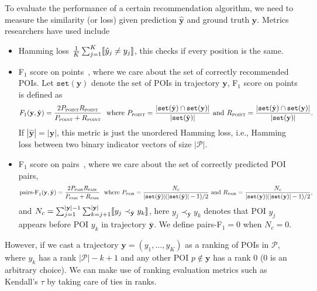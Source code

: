 To evaluate the performance of a certain recommendation algorithm,
we need to measure the similarity (or loss) given prediction $\hat{\mathbf{y}}$ and ground truth $\mathbf{y}$.
Metrics researchers have used include
\begin{itemize}
\item Hamming loss $\frac{1}{K} \sum_{j=1}^K \llbracket \hat{y}_j \neq y_j \rrbracket$, this checks if every position is the same.

\item F$_1$ score on points~\cite{ijcai15}, where we care about the set of correctly recommended POIs. 
      Let $\texttt{set}(\mathbf{y})$ denote the set of POIs in trajectory $\mathbf{y}$, F$_1$ score on points is defined as
\begin{equation*}
F_1(\mathbf{y}, \hat{\mathbf{y}}) = \frac{2  P_{\textsc{point}}  R_{\textsc{point}}}{P_{\textsc{point}} + R_{\textsc{point}}} ~~\text{where}~
P_{\textsc{point}} = \frac{| \texttt{set}(\hat{\mathbf{y}}) \cap \texttt{set}(\mathbf{y}) |}{| \texttt{set}(\hat{\mathbf{y}}) |}~\text{and}~
R_{\textsc{point}} = \frac{| \texttt{set}(\hat{\mathbf{y}}) \cap \texttt{set}(\mathbf{y}) |}{| \texttt{set}(\mathbf{y}) |}.
\end{equation*}
If $| \hat{\mathbf{y}} | = | \mathbf{y} |$, this metric is just the unordered Hamming loss, 
i.e., Hamming loss between two binary indicator vectors of size $| \mathcal{P} |$.

\item F$_1$ score on pairs~\cite{cikm16paper}, where we care about the set of correctly predicted POI pairs,
\begin{equation*}
\text{pairs-F}_1(\mathbf{y}, \hat{\mathbf{y}}) = \frac{2 P_{\textsc{pair}} R_{\textsc{pair}}}{P_{\textsc{pair}} + R_{\textsc{pair}}}~~\text{where}~
P_{\textsc{pair}} = \frac{N_c} {| \texttt{set}(\hat{\mathbf{y}}) | (| \texttt{set}(\hat{\mathbf{y}}) | - 1) / 2}~\text{and}~
R_{\textsc{pair}} = \frac{N_c} {| \texttt{set}(\mathbf{y}) | (| \texttt{set}(\mathbf{y}) | - 1) / 2},
\end{equation*}
and $N_c = \sum_{j=1}^{| \mathbf{y} | - 1} \sum_{k=j+1}^{| \mathbf{y} |} \llbracket y_j \prec_{\bar{\mathbf{y}}} y_k \rrbracket$,
here $y_j \prec_{\bar{\mathbf{y}}} y_k$ denotes that POI $y_j$ appears before POI $y_k$ in trajectory $\bar{\mathbf{y}}$.
We define pairs-F$_1 = 0$ when $N_c = 0$.

\end{itemize}

However, if we cast a trajectory $\mathbf{y} = (y_1,\dots,y_K)$ as a ranking of POIs in $\mathcal{P}$,
where $y_k$ has a rank $| \mathcal{P} | - k + 1$ and any other POI $p \notin \mathbf{y}$ has a rank $0$ ($0$ is an arbitrary choice).
We can make use of ranking evaluation metrics such as Kendall's $\tau$ by taking care of ties in ranks.

